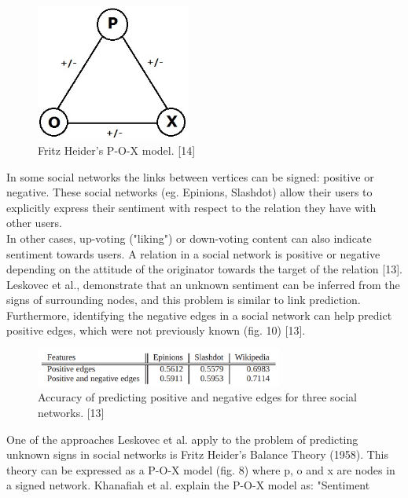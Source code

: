 \documentclass[conference,letterpaper]{IEEEtran}
\begin{document}
\begin{center}
\begin{figure}[hb]
\centering
\includegraphics[width=2.0in]{pox}
\caption{
Fritz Heider's P-O-X model. [14]
}
\label{fig_sim}
\end{figure}
\end{center}
In some social networks the links between vertices can be signed: positive or negative. These social networks
(eg. Epinions, Slashdot) allow their users to explicitly express their sentiment with respect to the relation
they have with other users.\\
In other cases, up-voting ("liking") or down-voting content can also indicate sentiment towards users.
A relation in a social network is positive or negative depending on the attitude of the originator towards the
target of the relation [13]. Leskovec et al., demonstrate that an unknown sentiment can be inferred from the
signs of surrounding nodes, and this problem is similar to link prediction. Furthermore, identifying the
negative edges in a social network can help predict positive edges, which were not previously known (fig. 10) [13]. \\
\begin{center}
\begin{figure}[hb]
\centering
\includegraphics[width=3.2in]{predicting_positive}
\caption{
Accuracy of predicting positive and negative edges for three social networks. [13]
}
\label{fig_sim}
\end{figure}
\end{center}
One of the approaches Leskovec et al. apply to the problem of predicting unknown signs in social networks
is Fritz Heider's Balance Theory (1958). This theory can be expressed as a P-O-X model (fig. 8)
where p, o and x are nodes in a signed network. Khanafiah et al. explain the P-O-X model as: "Sentiment
\end{document}

